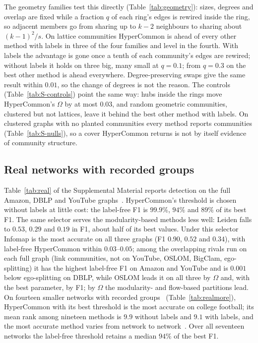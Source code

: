 The geometry families test this directly (Table~\ref{tab:geometry}): sizes, degrees and
overlap are fixed while a fraction $q$ of each ring's edges is rewired inside the ring,
so adjacent members go from sharing up to $k-2$ neighbours to sharing about
$(k-1)^2/s$. On lattice communities HyperCommon is ahead of every other method with
labels in three of the four families and level in the fourth. With labels the advantage
is gone once a tenth of each community's edges are rewired; without labels it holds on
three big, many small at $q=0.1$; from $q=0.3$ on the best other method is ahead
everywhere. Degree-preserving swaps give the same result within $0.01$, so the change of
degrees is not the reason. The controls (Table~\ref{tab:S-controls}) point the same way:
hubs inside the rings move HyperCommon's $\Omega$ by at most $0.03$, and random geometric
communities, clustered but not lattices, leave it behind the best other method with
labels. On clustered graphs with no planted communities every method reports
communities (Table~\ref{tab:S-nulls}), so a cover HyperCommon returns is not by itself
evidence of community structure.

\subsection{Real networks with recorded groups}
\label{sec:real}

Table~\ref{tab:real} of the Supplemental Material reports detection on the full Amazon,
DBLP and YouTube
graphs~\cite{yang2015defining}. HyperCommon's threshold is chosen without labels at
little cost: the label-free F1 is $99.9\%$, $94\%$ and $89\%$ of its best F1. The same
selector serves the modularity-based methods less well: Leiden falls to $0.53$, $0.29$
and $0.19$ in F1, about half of its best values. Under this selector Infomap is the most
accurate on all three graphs (F1 $0.90$, $0.52$ and $0.34$), with label-free HyperCommon within $0.03$--$0.05$; among the overlapping rivals run on each full graph (link communities, not on YouTube, OSLOM, BigClam, ego-splitting) it has the highest label-free F1 on Amazon and YouTube and is $0.001$ below ego-splitting on DBLP, while OSLOM leads it on all three by $\Omega$ and, with the best parameter, by F1; by $\Omega$ the modularity- and flow-based partitions
lead. On fourteen smaller networks with recorded
groups~\cite{peixoto2020netzschleuder,mcauley2012learning,girvan2002community,krebs_polbooks,adamic2005political,stehle2011high}
(Table~\ref{tab:realmore}), HyperCommon with its best threshold is the most accurate on
college football; its mean rank among nineteen methods is $9.9$ without labels and $9.1$
with labels, and the most
accurate method varies from network to network~\cite{peel2017ground}. Over all
seventeen networks the label-free threshold retains a median $94\%$ of the best F1.


